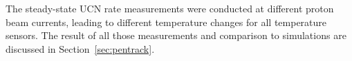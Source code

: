 The steady-state UCN rate measurements were conducted at different
proton beam currents, leading to different temperature changes for all
temperature sensors. The result of all those measurements and
comparison to simulations are discussed in Section~\ref{sec:pentrack}.










